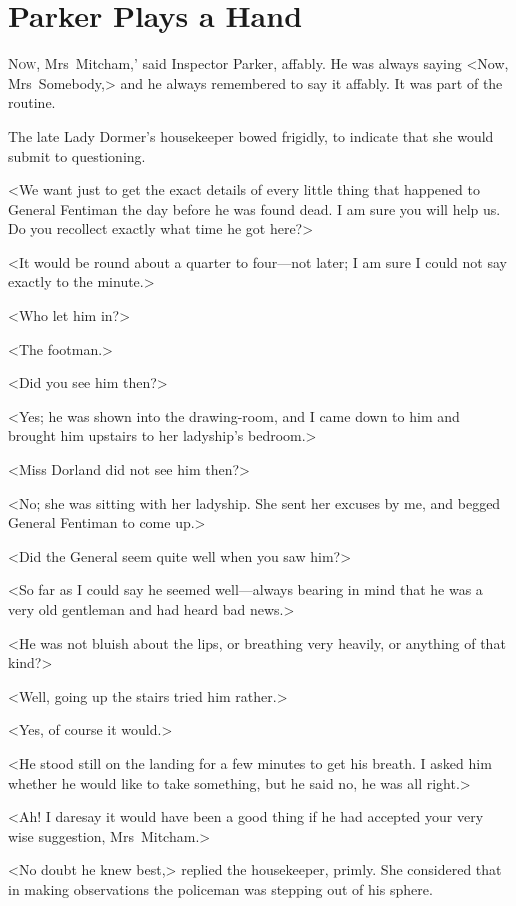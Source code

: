 \chapter{Parker Plays a Hand}

\lettrine[ante=‘]{N}{ow}, Mrs~Mitcham,' said Inspector Parker, affably. He was always saying <Now, Mrs~Somebody,> and he always remembered to say it affably. It was part of the routine.

\zz
The late Lady Dormer's housekeeper bowed frigidly, to indicate that she would submit to questioning.

<We want just to get the exact details of every little thing that happened to General Fentiman the day before he was found dead. I am sure you will help us. Do you recollect exactly what time he got here?>

<It would be round about a quarter to four—not later; I am sure I could not say exactly to the minute.>

<Who let him in?>

<The footman.>

<Did you see him then?>

<Yes; he was shown into the drawing-room, and I came down to him and brought him upstairs to her ladyship's bedroom.>

<Miss Dorland did not see him then?>

<No; she was sitting with her ladyship. She sent her excuses by me, and begged General Fentiman to come up.>

<Did the General seem quite well when you saw him?>

<So far as I could say he seemed well—always bearing in mind that he was a very old gentleman and had heard bad news.>

<He was not bluish about the lips, or breathing very heavily, or anything of that kind?>

<Well, going up the stairs tried him rather.>

<Yes, of course it would.>

<He stood still on the landing for a few minutes to get his breath. I asked him whether he would like to take something, but he said no, he was all right.>

<Ah! I daresay it would have been a good thing if he had accepted your very wise suggestion, Mrs~Mitcham.>

<No doubt he knew best,> replied the housekeeper, primly. She considered that in making observations the policeman was stepping out of his sphere.

